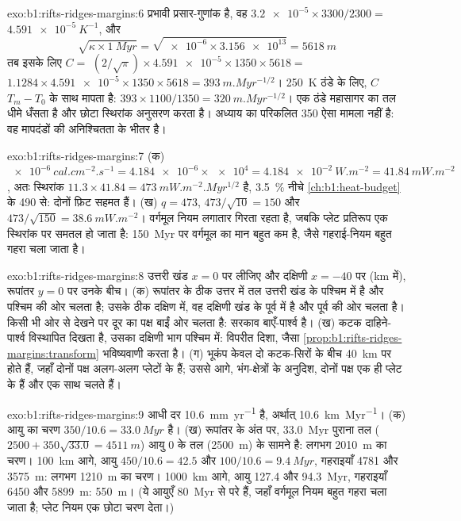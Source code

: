 \begin{solution}{exo:b1:rifts-ridges-margins:6}
प्रभावी प्रसार-गुणांक है, वह
$\num{3.2e-5}\times3300/2300 =$ $\qty{4.591e-5}{K^{-1}}$, और
\[ \sqrt{\kappa\times\qty{1}{Myr}} = \sqrt{\num{e-6}\times\num{3.156e13}} = \qty{5618}{m} \]
तब इसके लिए $C =$ $(2/\sqrt\pi)\times\num{4.591e-5}\times1350\times5618 =$
$1.1284\times\num{4.591e-5}\times1350\times5618 = \qty{393}{m.Myr^{-1/2}}$। \qty{250}{K} ठंडे  के लिए, $C$ $T_m - T_0$ के साथ मापता है:
$393\times1100/1350 = \qty{320}{m.Myr^{-1/2}}$। एक ठंडे महासागर का तल धीमे धँसता है और छोटा स्थिरांक अनुसरण करता है। अध्याय का परिकलित \num{350} ऐसा मामला नहीं है: वह मापदंडों की अनिश्चितता के भीतर है।
\end{solution}

\begin{solution}{exo:b1:rifts-ridges-margins:7}
(क) $\qty{e-6}{cal.cm^{-2}.s^{-1}} = \num{4.184e-6}\times\num{e4} =
\qty{4.184e-2}{W.m^{-2}} = \qty{41.84}{mW.m^{-2}}$, अतः स्थिरांक $11.3\times41.84 = \qty{473}{mW.m^{-2}.Myr^{1/2}}$ है, \qty{3.5}{\percent} नीचे \cref{ch:b1:heat-budget} के 490 से: दोनों फ़िट सहमत हैं। (ख) $q = 473$, $473/\sqrt{10} = 150$ और $473/\sqrt{150} = \qty{38.6}{mW.m^{-2}}$। वर्गमूल नियम लगातार गिरता रहता है, जबकि प्लेट प्रतिरूप एक स्थिरांक पर समतल हो जाता है: \qty{150}{Myr} पर वर्गमूल का मान बहुत कम है, जैसे गहराई-नियम बहुत गहरा चला जाता है।
\end{solution}

\begin{solution}{exo:b1:rifts-ridges-margins:8}
उत्तरी खंड $x = 0$ पर लीजिए और दक्षिणी $x = -40$ पर (\unit{km} में), रूपांतर $y = 0$ पर उनके बीच। (क) रूपांतर के ठीक उत्तर में तल उत्तरी खंड के पश्चिम में है और पश्चिम की ओर चलता है; उसके ठीक दक्षिण में, वह दक्षिणी खंड के पूर्व में है और पूर्व की ओर चलता है। किसी भी ओर से देखने पर दूर का पक्ष बाईं ओर चलता है: सरकाव बाएँ-पार्श्व है। (ख) कटक दाहिने-पार्श्व विस्थापित दिखता है, उसका दक्षिणी भाग पश्चिम में: विपरीत दिशा, जैसा \cref{prop:b1:rifts-ridges-margins:transform} भविष्यवाणी करता है। (ग) भूकंप केवल दो कटक-सिरों के बीच \qty{40}{km} पर होते हैं, जहाँ दोनों पक्ष अलग-अलग प्लेटों के हैं; उससे आगे, भंग-क्षेत्रों के अनुदिश, दोनों पक्ष एक ही प्लेट के हैं और एक साथ चलते हैं।
\end{solution}

\begin{solution}{exo:b1:rifts-ridges-margins:9}
आधी दर \qty{10.6}{mm.yr^{-1}} है, अर्थात् \qty{10.6}{km.Myr^{-1}}। (क) आयु का चरण $350/10.6 = \qty{33.0}{Myr}$ है। (ख) रूपांतर के अंत पर, \qty{33.0}{Myr} पुराना तल ($2500 + 350\sqrt{33.0} = \qty{4511}{m}$) आयु 0 के तल (\qty{2500}{m}) के सामने है: लगभग \qty{2010}{m} का चरण। \qty{100}{km} आगे, आयु $450/10.6 = 42.5$ और $100/10.6 = \qty{9.4}{Myr}$, गहराइयाँ 4781 और \qty{3575}{m}: लगभग \qty{1210}{m} का चरण। \qty{1000}{km} आगे, आयु 127.4 और \qty{94.3}{Myr}, गहराइयाँ 6450 और \qty{5899}{m}: \qty{550}{m}। (ये आयुएँ \qty{80}{Myr} से परे हैं, जहाँ वर्गमूल नियम बहुत गहरा चला जाता है; प्लेट नियम एक छोटा चरण देता।)
\end{solution}

